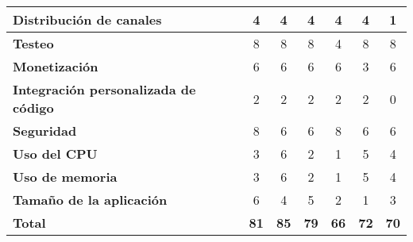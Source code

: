 \begin{footnotesize}
\begin{spacing}{1}
\begin{center}
\begin{longtable}[c]{ |>{\bfseries}p{}  |p{} |p{}  |p{}  |p{}  |p{}  |p{}|   }
                \hline
                Distribución de canales                & \multicolumn{1}{c|}{4}              & \multicolumn{1}{c|}{4}                      & \multicolumn{1}{c|}{4}  & \multicolumn{1}{c|}{4}  & \multicolumn{1}{c|}{4}  & \multicolumn{1}{c|}{1}  \\
                \hline
                Testeo                                 & \multicolumn{1}{c|}{8}              & \multicolumn{1}{c|}{8}                      & \multicolumn{1}{c|}{8}                 & \multicolumn{1}{c|}{4}  & \multicolumn{1}{c|}{8}  & \multicolumn{1}{c|}{8}  \\
                \hline
                Monetización                           & \multicolumn{1}{c|}{6}              & \multicolumn{1}{c|}{6}                      & \multicolumn{1}{c|}{6}                 & \multicolumn{1}{c|}{6}  & \multicolumn{1}{c|}{3}  & \multicolumn{1}{c|}{6}  \\
                \hline
                Integración personalizada de código    & \multicolumn{1}{c|}{2}              & \multicolumn{1}{c|}{2}                      & \multicolumn{1}{c|}{2}  & \multicolumn{1}{c|}{2}  & \multicolumn{1}{c|}{2}  & \multicolumn{1}{c|}{0}  \\
                \hline
                Seguridad                              & \multicolumn{1}{c|}{8}              & \multicolumn{1}{c|}{6}                      & \multicolumn{1}{c|}{6}                 & \multicolumn{1}{c|}{8}  & \multicolumn{1}{c|}{6}  & \multicolumn{1}{c|}{6}  \\
                \hline
                Uso del CPU                            & \multicolumn{1}{c|}{3}              & \multicolumn{1}{c|}{6}                      & \multicolumn{1}{c|}{2}                 & \multicolumn{1}{c|}{1}  & \multicolumn{1}{c|}{5}  & \multicolumn{1}{c|}{4}  \\
                \hline
                Uso de memoria                         & \multicolumn{1}{c|}{3}              & \multicolumn{1}{c|}{6}                      & \multicolumn{1}{c|}{2}  & \multicolumn{1}{c|}{1}  & \multicolumn{1}{c|}{5}  & \multicolumn{1}{c|}{4}  \\
                \hline
                Tamaño de la aplicación                & \multicolumn{1}{c|}{6}              & \multicolumn{1}{c|}{4}                      & \multicolumn{1}{c|}{5}  & \multicolumn{1}{c|}{2}  & \multicolumn{1}{c|}{1}  & \multicolumn{1}{c|}{3}  \\
                \hline
                \textbf{Total}                         & \multicolumn{1}{c|}{\textbf{81}}    & \multicolumn{1}{c|}{\textbf{85}}            & \multicolumn{1}{c|}{\textbf{79}}                           & \multicolumn{1}{c|}{\textbf{66}}                                & \multicolumn{1}{c|}{\textbf{72}}                        & \multicolumn{1}{c|}{\textbf{70}}                           \\

\end{longtable}
\end{center}
\end{spacing}
\end{footnotesize}
